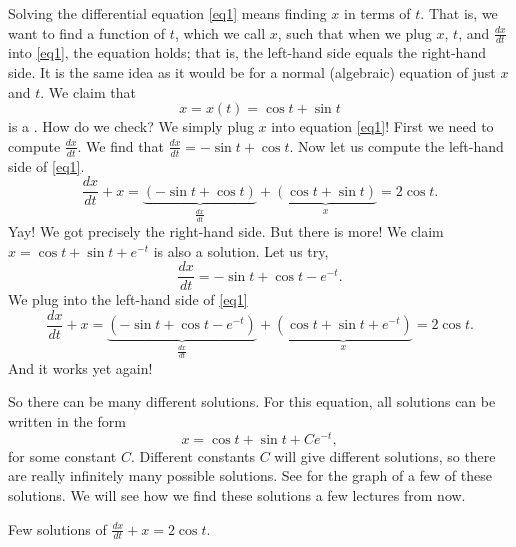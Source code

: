 Solving the differential equation \eqref{eq1} means finding $x$ in terms of $t$.  That
is, we want to find a function of $t$, which we call $x$, such that when
we plug $x$, $t$, and $\frac{dx}{dt}$ into \eqref{eq1}, the equation holds;
that is, the left-hand side equals the right-hand side.
It is
the same idea as it would be for a normal (algebraic) equation of just
$x$ and $t$.  We claim that
\begin{equation*}
x = x(t) = \cos t + \sin t
\end{equation*}
is a \emph{}.
How do we check?  We simply plug $x$ into equation \eqref{eq1}!  First we
need to compute $\frac{dx}{dt}$.  We find that $\frac{dx}{dt} = 
-\sin t + \cos t$.  Now let us compute the left-hand side
of \eqref{eq1}.
\begin{equation*}
\frac{dx}{dt} + x = 
\underbrace{(-\sin t + \cos t)}_{\frac{dx}{dt}}
+
\underbrace{(\cos t + \sin t)}_{x}
=
2\cos t .
\end{equation*}
Yay!  We got precisely the right-hand side.
But there is more!
We claim
$x = \cos t + \sin t + e^{-t}$ is also
a solution.  Let us try,
\begin{equation*}
\frac{dx}{dt} = -\sin t + \cos t - e^{-t} .
\end{equation*}
We plug into the left-hand side of \eqref{eq1}
\begin{equation*}
\frac{dx}{dt} + x = 
\underbrace{(-\sin t + \cos t - e^{-t})}_{\frac{dx}{dt}} +
\underbrace{(\cos t + \sin t + e^{-t})}_{x}
= 2\cos t .
\end{equation*}
And it works yet again!

So there can be many different solutions.  For this equation, all
solutions can be written in the form
\begin{equation*}
x = \cos t + \sin t + C e^{-t} ,
\end{equation*}
for some constant $C$.  Different constants $C$ will give different
solutions, so there are really infinitely many possible solutions.
See  for the graph of a
few of these solutions. 
We will see how we find these solutions
a few lectures from now.

\medskip

\begin{mywrapfig}{3.25in}
\capstart
{}
\caption{Few solutions of $\frac{dx}{dt} + x = 2 \cos t$.\label{intro:plotsfig}}
\end{mywrapfig}%


